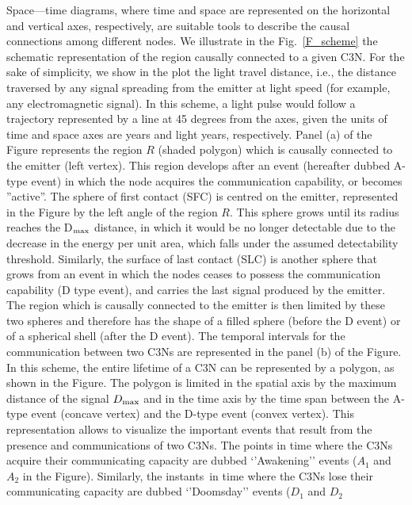 \documentclass[crop]{CSLB}
\newcommand{\ceti}{C3N}
\newcommand{\cetis}{C3Ns}
\newcommand{\ffn}[1]{}
\begin{document}
\ffn{1} Space—time diagrams, where time and space are represented on
the horizontal and vertical axes, respectively, are suitable tools to
describe the causal connections among different nodes.
%
We illustrate in the Fig.~\ref{F_scheme} the schematic representation
of the region causally connected to a given \ceti{}.
%
For the sake of simplicity, we show in the plot the light travel
distance, i.e., the distance traversed by any signal spreading from
the emitter at light speed (for example, any electromagnetic signal).
%
In this scheme, a light pulse would follow a trajectory represented by
a line at 45 degrees from the axes, given the units of time and
space axes are years and light years, respectively.
%
Panel (a) of the Figure represents the region $R$ (shaded polygon)
which is causally connected to the emitter (left vertex).
%
This region develops after an event (hereafter dubbed A-type event) in
which the node acquires the communication capability, or becomes
''active''.
%
The sphere of first contact (SFC) is centred on the emitter,
represented in the Figure by the left angle of the region $R$.
%
This sphere grows until its radius reaches the D$_{\rm max}$ distance, in
which it would be no longer detectable due to the decrease in the
energy per unit area, which falls under the assumed detectability
threshold.
%
Similarly, the surface of last contact (SLC) is another sphere that
grows from an event in which the nodes ceases to possess the
communication capability (D type event), and carries the last signal
produced by the emitter.
%
The region which is causally connected to the emitter is then limited
by these two spheres and therefore has the shape of a filled sphere
(before the D event) or of a spherical shell (after the D event).
%
The temporal intervals for the communication between two \cetis{} are
represented in the panel (b) of the Figure.
%
In this scheme, the entire lifetime of a \ceti{} can be represented by
a polygon, as shown in the Figure.
%
The polygon is limited in the spatial axis by the maximum distance of
the signal $D_{\rm max}$ and in the time axis by the time span between the
A-type event (concave vertex) and the D-type event (convex vertex).
%
This representation allows to visualize the important events that
result from the presence and communications of two \cetis{}.
%
The points in time where the \cetis{} acquire their communicating
capacity are dubbed ‘’Awakening’’ events ($A_1$ and $A_2$ in the
Figure).
%
Similarly, the instants in time where the \cetis{} lose their
communicating capacity are dubbed ‘’Doomsday’’ events ($D_1$ and $D_2$
\end{document}
